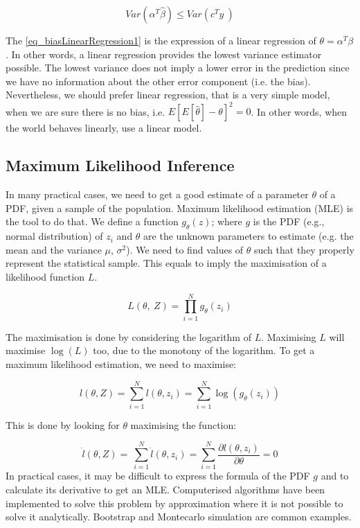 \begin{equation}
Var\left(\alpha^T\hat{\beta}\right)\le Var(c^Ty\ )
\label{eq_biasLinearRegression3}
\end{equation}

The \ref{eq_biasLinearRegression1} is the expression of a linear regression of $\theta=\alpha^T\beta$. In other words, a linear regression  provides the lowest variance estimator possible. The lowest variance does not imply a lower error in the prediction since we have no information about the other error component (i.e. the bias). Nevertheless, we should prefer linear regression, that is a very simple model, when we are sure there is no bias, i.e. $E\left[E\left[\hat{\theta}\right]-\theta\right]^2=0$. In other words, when the world behaves linearly, use a linear model.

\subsection{Maximum Likelihood Inference}
In many practical cases, we need to get a good estimate of a parameter $\theta$ of a PDF, given a sample of the population. Maximum likelihood estimation (MLE) is the tool to do that. We define a function $g_\theta(z)$; where $g$ is the PDF (e.g., normal distribution) of $z_i$ and $\theta$ are the unknown parameters to estimate (e.g. the mean and the variance $\mu$, $\sigma^2$). We need to find values of $\theta$ such that they properly represent the statistical sample. This equals to imply the maximisation of a likelihood function $L$.

\begin{equation}
L\left(\theta,\ Z\right)=\prod_{i=1}^{N}{g_\theta(z_i)}
\label{eq_MLE1}
\end{equation}

The maximisation is done by considering the logarithm of $L$. Maximising $L$ will maximise $\log(L)$ too, due to the monotony of the logarithm. To get a maximum likelihood estimation, we need to maximise:

\begin{equation}
l\left(\theta,Z\right)=\sum_{i=1}^{N}{l\left(\theta,z_i\right)=\sum_{i=1}^{N}\log{\left(g_\theta\left(z_i\right)\right)}}
\label{eq_MLE2}
\end{equation}

This is done by looking for $\theta$ maximising the function:

\begin{equation}
\dot{l}\left(\theta,Z\right)=\ \sum_{i=1}^{N}{\dot{l}\left(\theta,z_i\right)=\sum_{i=1}^{N}{\frac{\partial l\left(\theta,z_i\right)}{\partial\theta}=0}}
\label{eq_MLE3}
\end{equation}
In practical cases, it may be difficult to express the formula of the PDF $g$ and to calculate its derivative to get an MLE. Computerised algorithms have been implemented to solve this problem by approximation where it is not possible to solve it analytically. Bootstrap and Montecarlo simulation are common examples.

